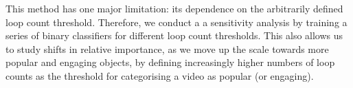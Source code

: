 This method has one major limitation: its dependence on the arbitrarily defined loop count threshold. Therefore, we conduct a a sensitivity analysis by training a series of binary classifiers for different loop count thresholds. This also allows us to study shifts in relative importance, as we move up the scale towards more popular and engaging objects, by defining increasingly higher numbers of loop counts as the threshold for categorising a video as popular (or engaging). 
%
%
